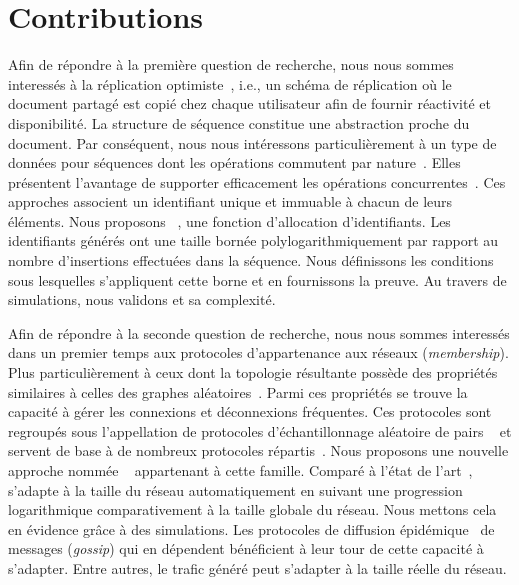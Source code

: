 
\section{Contributions}

Afin de répondre à la première question de recherche, nous nous sommes
interessés à la réplication optimiste~\cite{demers1987epidemic,
  saito2005optimistic}, i.e., un schéma de réplication où le document partagé
est copié chez chaque utilisateur afin de fournir réactivité et
disponibilité. La structure de séquence constitue une abstraction proche du
document. Par conséquent, nous nous intéressons particulièrement à un type de
données pour séquences dont les opérations commutent par
nature~\cite{burckhardt2014replicated, shapiro2011comprehensive,
  shapiro2011conflict, zawirski2015dependable}. Elles présentent l'avantage de
supporter efficacement les opérations concurrentes~\cite{ahmed2015evaluation,
  ahmed2011evaluating}. Ces approches associent un identifiant unique et
immuable à chacun de leurs éléments. Nous proposons
\LSEQ~\cite{nedelec2013concurrency, nedelec2013lseq}, une fonction d'allocation
d'identifiants. Les identifiants générés ont une taille bornée
polylogarithmiquement par rapport au nombre d'insertions effectuées dans la
séquence. Nous définissons les conditions sous lesquelles s'appliquent cette
borne et en fournissons la preuve. Au travers de simulations, nous validons
\LSEQ et sa complexité.

Afin de répondre à la seconde question de recherche, nous nous sommes interessés
dans un premier temps aux protocoles d'appartenance aux réseaux
(\emph{membership}). Plus particulièrement à ceux dont la topologie résultante
possède des propriétés similaires à celles des graphes
aléatoires~\cite{erdos1959random}. Parmi ces propriétés se trouve la capacité à
gérer les connexions et déconnexions fréquentes. Ces protocoles sont regroupés
sous l'appellation de \og protocoles d'échantillonnage aléatoire de
pairs \fg~\cite{jelasity2004peer, jelasity2007gossip} et servent de base à de
nombreux protocoles répartis~\cite{dabek2004vivaldi, folz2016cyclades,
  montresor2005chord}. Nous proposons une nouvelle approche nommée
\SPRAY~\cite{nedelec2015spray} appartenant à cette famille. Comparé à l'état de
l'art~\cite{eugster2003lightweight, ganesh2001scamp, jelasity2007gossip,
  leitao2007dependable, tolgyeski2009adaptive, voulgaris2005cyclon}, \SPRAY
s'adapte à la taille du réseau automatiquement en suivant une progression
logarithmique comparativement à la taille globale du réseau. Nous mettons cela
en évidence grâce à des simulations.  Les protocoles de diffusion
épidémique~\cite{birman1999bimodal} de messages (\emph{gossip}) qui en dépendent
bénéficient à leur tour de cette capacité à s'adapter. Entre autres, le trafic
généré peut s'adapter à la taille réelle du réseau.

